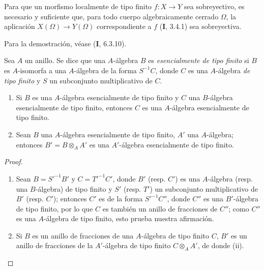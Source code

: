 \begin{proposition}[1.3.7]
\label{IV.1.3.7-fr}
Para que un morfismo localmente de tipo finito $f:X\to Y$ sea sobreyectivo, es
necesario y suficiente que, para todo cuerpo algebraicamente cerrado $\Omega$,
la aplicación $X(\Omega)\to Y(\Omega)$ correspondiente a $f$ \textup{(\textbf{I}, 3.4.1)} sea
sobreyectiva.
\end{proposition}

Para la demostración, véase (\textbf{I}, 6.3.10).

\begin{env}[1.3.8]
\label{IV.1.3.8-fr}
Sea $A$ un anillo. Se dice que una $A$-álgebra $B$ es \emph{esencialmente de
tipo finito} si $B$ es $A$-isomorfa a una $A$-álgebra de la forma $S^{-1}C$,
donde $C$ es una $A$-álgebra \emph{de tipo finito} y $S$ un subconjunto multiplicativo
de $C$.
\end{env}

\par\medskip\noindent
\begin{proposition}[1.3.9]
\label{IV.1.3.9-fr}
\begin{enumerate}
  \item[\textup{(i)}] Si $B$ es una $A$-álgebra esencialmente de tipo finito y $C$
  una $B$-álgebra esencialmente de tipo finito, entonces $C$ es una
  $A$-álgebra esencialmente de tipo finito.
  \item[\textup{(ii)}] Sean $B$ una $A$-álgebra esencialmente de tipo finito, $A'$
  una $A$-álgebra; entonces $B'=B\otimes_AA'$ es una $A'$-álgebra
  esencialmente de tipo finito.
\end{enumerate}
\end{proposition}

\begin{proof}
\begin{enumerate}
  \item[(i)] Sean $B=S'^{-1}B'$ y $C=T'^{-1}C'$, donde $B'$ (resp. $C'$) es
  una $A$-álgebra (resp. una $B$-álgebra) de tipo finito y $S'$ (resp. $T'$)
  un subconjunto multiplicativo de $B'$ (resp. $C'$); entonces $C'$ es de la forma
  $S'^{-1}C''$, donde $C''$ es una $B'$-álgebra de tipo finito, por lo que $C$ es también
  un anillo de fracciones de $C''$; como $C''$ es una $A$-álgebra de tipo
  finito, esto prueba nuestra afirmación.
  \item[(ii)] Si $B$ es un anillo de fracciones de una $A$-álgebra de tipo finito
  $C$, $B'$ es un anillo de fracciones de la $A'$-álgebra de tipo finito
  $C\otimes_AA'$, de donde (ii).
\end{enumerate}
\end{proof}

